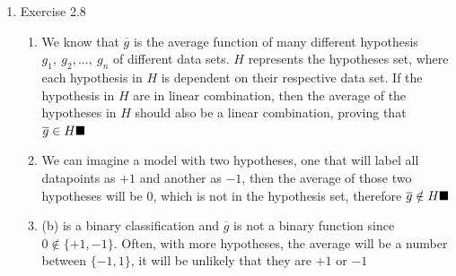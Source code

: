 \documentclass{article}
\begin{document}
    \begin{enumerate}
        \item Exercise 2.8
        \begin{enumerate}[label=(\alph*)]
            \item We know that $\overline{g}$ is the average function of many different hypothesis $g_1,\ g_2,...,\ g_n$ of different data sets. $H$ represents the hypotheses set, where each hypothesis in $H$ is dependent on their respective data set. If the hypothesis in $H$ are in linear combination, then the average of the hypotheses in $H$ should also be a linear combination, proving that $\overline{g} \in H \hfill \blacksquare$
            \item We can imagine a model with two hypotheses, one that will label all datapoints as $+1$ and another as $-1$, then the average of those two hypotheses will be $0$, which is not in the hypothesis set, therefore $\overline{g} \notin H \hfill \blacksquare$
            \item (b) is a binary classification and $\overline{g}$ is not a binary function since $0 \notin \{+1, -1\}$. Often, with more hypotheses, the average will be a number between $\{-1, 1\}$, it will be unlikely that they are $+1$ or $-1$
        \end{enumerate}


\end{enumerate}
\end{document}
